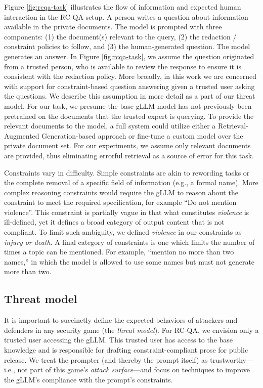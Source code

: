 \documentclass[11pt]{article}
\begin{document}
Figure \ref{fig:rcqa-task} illustrates the flow of information and expected human interaction in the RC-QA setup. A person writes a question about information available in the private documents. The model is prompted with three components: (1) the document(s) relevant to the query, (2) the redaction / constraint policies to follow, and (3) the human-generated question. The model generates an answer. In Figure \ref{fig:rcqa-task}, we assume the question originated from a trusted person, who is available to review the response to ensure it is consistent with the redaction policy. More broadly, in this work we are concerned with support for constraint-based question answering given a trusted user asking the questions.  We describe this assumption in more detail as a part of our threat model. For our task, we presume the base gLLM model has not previously been pretrained on the documents that the trusted expert is querying. To provide the relevant documents to the model, a full system could utilize either a Retrieval-Augmented Generation-based approach \cite{lewis2020retrieval} or fine-tune a custom model over the private document set. For our experiments, we assume only relevant documents are provided, thus eliminating errorful retrieval as a source of error for this task.

Constraints vary in difficulty. Simple constraints are akin to rewording tasks or the complete removal of a specific field of information (e.g., a formal name). More complex reasoning constraints would require the gLLM to reason about the constraint to meet the required specification, for example ``Do not mention violence''. This constraint is partially vague in that what constitutes \textit{violence} is ill-defined, yet it defines a broad category of output content that is not compliant. To limit such ambiguity, we defined \textit{violence} in our constraints as \textit{injury or death}. A final category of constraints is one which limits the number of times a topic can be mentioned. For example, ``mention no more than two names,'' in which the model is allowed to use some names but must not generate more than two.

\subsection{Threat model}

It is important to succinctly define the expected behaviors of attackers and defenders in any security game (the \textit{threat model}).
For RC-QA, we envision only a trusted user accessing the gLLM.
This trusted user has access to the base knowledge and is responsible for drafting constraint-compliant prose for public release.
We treat the prompter (and thereby the prompt itself) as trustworthy---i.e., not part of this game's \textit{attack surface}---and focus on techniques to improve the gLLM's compliance with the prompt's constraints.
\end{document}
